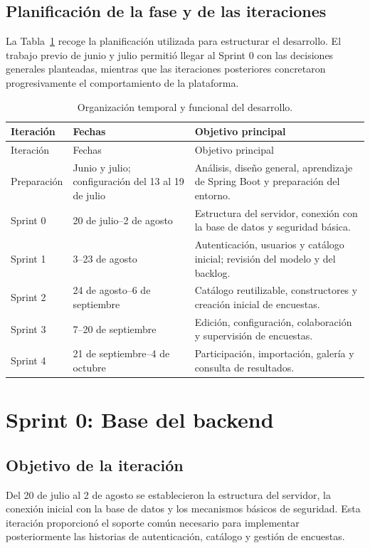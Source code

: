 \documentclass[11pt,a4paper]{report}
\begin{document}
\subsection{Planificación de la fase y de las iteraciones}

La Tabla~\ref{tab:plan-desarrollo} recoge la planificación utilizada para estructurar el desarrollo. El trabajo previo de junio y julio permitió llegar al Sprint 0 con las decisiones generales planteadas, mientras que las iteraciones posteriores concretaron progresivamente el comportamiento de la plataforma.

\begin{longtable}{p{}p{}p{}}
\caption{Organización temporal y funcional del desarrollo.}\label{tab:plan-desarrollo}\\
\toprule Iteración & Fechas & Objetivo principal \\ \midrule
\endfirsthead
\toprule Iteración & Fechas & Objetivo principal \\ \midrule
\endhead
Preparación & Junio y julio; configuración del 13 al 19 de julio & Análisis, diseño general, aprendizaje de Spring Boot y preparación del entorno. \\
Sprint 0 & 20 de julio--2 de agosto & Estructura del servidor, conexión con la base de datos y seguridad básica. \\
Sprint 1 & 3--23 de agosto & Autenticación, usuarios y catálogo inicial; revisión del modelo y del backlog. \\
Sprint 2 & 24 de agosto--6 de septiembre & Catálogo reutilizable, constructores y creación inicial de encuestas. \\
Sprint 3 & 7--20 de septiembre & Edición, configuración, colaboración y supervisión de encuestas. \\
Sprint 4 & 21 de septiembre--4 de octubre & Participación, importación, galería y consulta de resultados. \\
\bottomrule
\end{longtable}

\section{Sprint 0: Base del backend}
\subsection{Objetivo de la iteración}

Del 20 de julio al 2 de agosto se establecieron la estructura del servidor, la conexión inicial con la base de datos y los mecanismos básicos de seguridad. Esta iteración proporcionó el soporte común necesario para implementar posteriormente las historias de autenticación, catálogo y gestión de encuestas.
\end{document}
